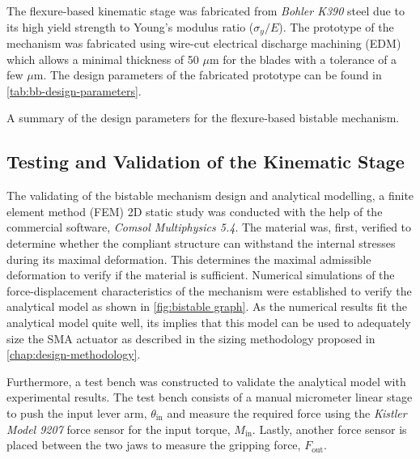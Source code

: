 The flexure-based kinematic stage was fabricated from \textit{Bohler K390} steel due to its high yield strength to Young's modulus ratio ($\sigma_y/E$). The prototype of the mechanism was fabricated using wire-cut electrical discharge machining (EDM) which allows a minimal thickness of 50 $\mu$m for the blades with a tolerance of a few $\mu$m. The design parameters of the fabricated prototype can be found in \cref{tab:bb-design-parameters}.

\begin{table}[hbt!]
    \centering
    \caption{A summary of the design parameters for the flexure-based bistable mechanism.}
    \label{tab:bb-design-parameters}
    
\end{table}

\subsection{Testing and Validation of the Kinematic Stage}
The validating of the bistable mechanism design and analytical modelling, a finite element method (FEM) 2D static study was conducted with the help of the commercial software, \textit{Comsol Multiphysics 5.4}. The material was, first, verified to determine whether the compliant structure can withstand the internal stresses during its maximal deformation. This determines the maximal admissible deformation to verify if the material is sufficient. Numerical simulations of the force-displacement characteristics of the mechanism were established to verify the analytical model as shown in \cref{fig:bistable graph}. As the numerical results fit the analytical model quite well, its implies that this model can be used to adequately size the SMA actuator as described in the sizing methodology proposed in \cref{chap:design-methodology}.

Furthermore, a test bench was constructed to validate the analytical model with experimental results. The test bench consists of a manual micrometer linear stage to push the input lever arm, $\theta_\mathrm{in}$ and measure the required force using the \textit{Kistler Model 9207} force sensor for the input torque, $M_\mathrm{in}$. Lastly, another force sensor is placed between the two jaws to measure the gripping force, $F_\mathrm{out}$.

